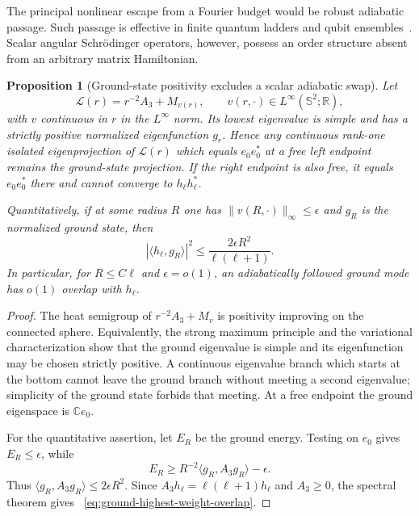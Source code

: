 \documentclass[11pt]{article}
\newtheorem{proposition}[theorem]{Proposition}
\theoremstyle{definition}
\theoremstyle{remark}
\begin{document}
The principal nonlinear escape from a Fourier budget would be robust adiabatic
passage.  Such passage is effective in finite quantum ladders and qubit
ensembles~\cite{LeghtasSarletteRouchon2011,RobinEtAl2021}.  Scalar angular
Schr\"odinger operators, however, possess an order structure absent from an
arbitrary matrix Hamiltonian.

\begin{proposition}[Ground-state positivity excludes a scalar adiabatic swap]
\label{prop:scalar-ground-adiabatic-no-go}
Let
\begin{equation}
 \mathcal L(r)=r^{-2}A_3+M_{v(r)},
 \qquad v(r,\cdot)\in L^\infty(\mathbb S^2;\mathbb R),
 \label{eq:instantaneous-angular-Hamiltonian}
\end{equation}
with $v$ continuous in $r$ in the $L^\infty$ norm.  Its lowest eigenvalue is
simple and has a strictly positive normalized eigenfunction $g_r$.  Hence any
continuous rank-one isolated eigenprojection of $\mathcal L(r)$ which equals
$e_0e_0^*$ at a free left endpoint remains the ground-state projection.  If the
right endpoint is also free, it equals $e_0e_0^*$ there and cannot converge to
$h_\ell h_\ell^*$.

Quantitatively, if at some radius $R$ one has
$\|v(R,\cdot)\|_\infty\leq\epsilon$ and $g_R$ is the normalized ground state,
then
\begin{equation}
 |\langle h_\ell,g_R\rangle|^2
 \leq\frac{2\epsilon R^2}{\ell(\ell+1)}.
 \label{eq:ground-highest-weight-overlap}
\end{equation}
In particular, for $R\leq C\ell$ and $\epsilon=o(1)$, an adiabatically followed
ground mode has $o(1)$ overlap with $h_\ell$.
\end{proposition}

\begin{proof}
The heat semigroup of $r^{-2}A_3+M_v$ is positivity improving on the connected
sphere.  Equivalently, the strong maximum principle and the variational
characterization show that the ground eigenvalue is simple and its eigenfunction
may be chosen strictly positive.  A continuous eigenvalue branch which starts
at the bottom cannot leave the ground branch without meeting a second
eigenvalue; simplicity of the ground state forbids that meeting.  At a free
endpoint the ground eigenspace is $\mathbb C e_0$.

For the quantitative assertion, let $E_R$ be the ground energy.  Testing on
$e_0$ gives $E_R\leq\epsilon$, while
\begin{equation}
 E_R\geq R^{-2}\langle g_R,A_3g_R\rangle-\epsilon.
\end{equation}
Thus $\langle g_R,A_3g_R\rangle\leq2\epsilon R^2$.  Since
$A_3h_\ell=\ell(\ell+1)h_\ell$ and $A_3\geq0$, the spectral theorem gives
~\eqref{eq:ground-highest-weight-overlap}.
\end{proof}
\end{document}
